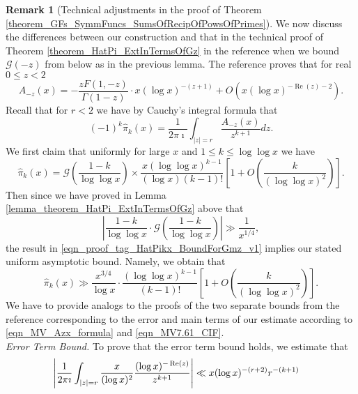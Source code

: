\documentclass[11pt,reqno,a4letter]{article}
\numberwithin{figure}{section}
\numberwithin{table}{section}
\theoremstyle{plain}
\numberwithin{theorem}{section}
\theoremstyle{definition}
\newtheorem{remark}[theorem]{Remark}
\renewcommand{\Re}{\operatorname{Re}}
\begin{document}
\begin{remark}[Technical adjustments in the proof of Theorem \ref{theorem_GFs_SymmFuncs_SumsOfRecipOfPowsOfPrimes}] 
\label{remark_TechAdjustments_theorem_HatPi_ExtInTermsOfGz_TO_GFs_SymmFuncs_SumsOfRecipOfPowsOfPrimes} 
We now discuss the differences between our construction and that in 
the technical proof of Theorem \ref{theorem_HatPi_ExtInTermsOfGz} 
in the reference when we bound $\mathcal{G}(-z)$ from below as in 
the previous lemma. 
The reference proves that for real $0 \leq z < 2$ 
\begin{equation} 
\label{eqn_MV_Azx_formula} 
A_{-z}(x) = -\frac{z F(1, -z)}{\Gamma(1-z)} \cdot x (\log x)^{-(z+1)} + 
     O\left(x (\log x)^{-\Re(z) - 2}\right). 
\end{equation}
Recall that for $r < 2$ we have by Cauchy's integral formula that 
\begin{equation} 
\label{eqn_MV7.61_CIF} 
(-1)^{k} \widehat{\pi}_k(x) = \frac{1}{2\pi\imath} \int_{|z|=r} 
     \frac{A_{-z}(x)}{z^{k+1}} dz. 
\end{equation} 
We first claim that uniformly for large $x$ and $1 \leq k \leq \log\log x$ we have 
\begin{equation} 
\label{eqn_proof_tag_HatPikx_BoundForGmz_v1} 
\widehat{\pi}_k(x) = \mathcal{G}\left(\frac{1-k}{\log\log x}\right) \times 
     \frac{x (\log\log x)^{k-1}}{(\log x) (k-1)!} 
     \left[1 + O\left(\frac{k}{(\log\log x)^2}\right)\right]. 
\end{equation} 
Then since we have proved in Lemma \ref{lemma_theorem_HatPi_ExtInTermsOfGz} 
above that 
\[
\left\lvert \frac{1-k}{\log\log x} \cdot \mathcal{G}\left(\frac{1-k}{\log\log x}\right) \right\rvert \gg 
     \frac{1}{x^{1/4}}, 
\]
the result in \eqref{eqn_proof_tag_HatPikx_BoundForGmz_v1} implies our 
stated uniform asymptotic bound. Namely, we obtain that 
\[
\widehat{\pi}_k(x) \gg 
     \frac{x^{3/4}}{\log x} \cdot 
     \frac{(\log\log x)^{k-1}}{(k-1)!} \left[1 + 
     O\left(\frac{k}{(\log\log x)^2}\right)\right]. 
\]
We have to provide analogs to the proofs of the 
two separate bounds from the reference corresponding to the error and 
main terms of our estimate according to 
\eqref{eqn_MV_Azx_formula} and \eqref{eqn_MV7.61_CIF}. \\ 
\textit{Error Term Bound.} 
To prove that the error term bound holds, we estimate that 
\begin{align} 
\notag 
\left\lvert \frac{1}{2\pi\imath} \int_{|z|=r} 
     \frac{x}{(\log x)^2} \frac{(\log x)^{-\Re(z)}}{z^{k+1}} \right\rvert & \ll 
     x (\log x)^{-(r+2)} r^{-(k+1)} 

\end{align}
\end{remark}
\end{document}
